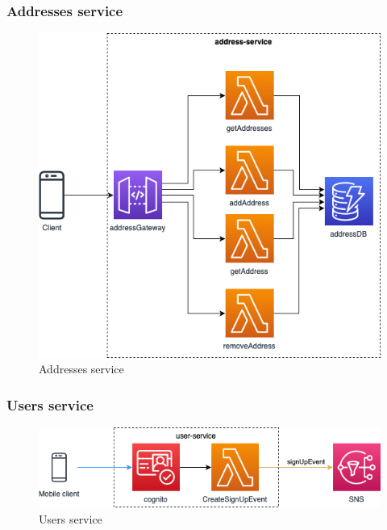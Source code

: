\subsubsection{Addresses service}
\begin{figure}[H]
	\centering
	\includegraphics[scale=0.4]{Immagini/Backend/AWSAddresses.png}
	\caption{Addresses service}
	\label{fig:Adresses}
\end{figure}
\subsubsection{Users service}
\begin{figure}[H]
	\centering
	\includegraphics[scale=0.7]{Immagini/Backend/AWSUserService.png}
	\caption{Users service}
	\label{fig:Users}
\end{figure}
